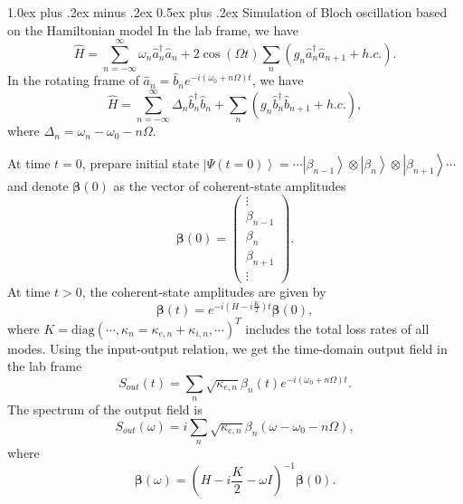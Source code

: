 \documentclass[
twocolumn,

superscriptaddress,









 amsmath,amssymb,
 aps,


prl,




]{revtex4-2}
\makeatletter
\providecommand{\subsubsection}{}
\renewcommand{\subsubsection}{
  \@startsection{subsubsection}{3}{0pt}
    {1.0ex plus .2ex minus .2ex}
    {0.5ex plus .2ex}
    {\normalfont\normalsize\bfseries\filcenter}
}
\newcommand{\ket}[1]{\left | #1 \right \rangle}
\newcommand{\opa}{\hat{a}}
\newcommand{\opad}{\hat{a}^\dagger}
\newcommand{\opb}{\hat{b}}
\newcommand{\opbd}{\hat{b}^\dagger}
\newcommand{\oph}{\hat{H}}
\makeatother
\begin{document}
\subsubsection{Simulation of Bloch oscillation based on the Hamiltonian model}
In the lab frame, we have
\begin{equation}
	\oph = \sum_{n=-\infty}^\infty \omega_n \opad_n \opa_n + 2 \cos (\Omega t) \sum_n (g_n \opad_n \opa_{n+1} + h.c.) .
\end{equation}
In the rotating frame of $\opa_n = \opb_n e^{-i(\omega_0+n\Omega) t}$, we have
\begin{equation}
	\oph = \sum_{n=-\infty}^\infty \Delta_n \opbd_n \opb_n + \sum_n (g_n \opbd_n \opb_{n+1} + h.c.) ,
\end{equation}
where $\Delta_n = \omega_n - \omega_0 - n\Omega$.

At time $t=0$, prepare initial state $\ket{\Psi(t=0)} = \cdots \ket{\beta_{n-1}} \otimes \ket{\beta_n} \otimes \ket{\beta_{n+1}} \cdots$ and denote $\bm{\beta}(0)$ as the vector of coherent-state amplitudes
\begin{equation}
	\bm{\beta}(0) = \begin{pmatrix} \vdots \\ \beta_{n-1} \\ \beta_n \\ \beta_{n+1} \\ \vdots \end{pmatrix} .
\end{equation}
At time $t > 0$, the coherent-state amplitudes are given by
\begin{equation}
	\bm{\beta} (t) = e^{-i(H-i\frac{K}{2})t} \bm{\beta} (0) ,
\end{equation}
where $K=\text{diag}(\cdots, \kappa_n = \kappa_{e,n}+\kappa_{i,n}, \cdots)^T$ includes the total loss rates of all modes. Using the input-output relation, we get the time-domain output field in the lab frame
\begin{equation}
	S_{out} (t) = \sum_n \sqrt{\kappa_{e,n}} \beta_n(t) e^{-i(\omega_0+n\Omega) t} .
\end{equation}
The spectrum of the output field is
\begin{equation}
	S_{out} (\omega) = i \sum_n \sqrt{\kappa_{e,n}} \beta_n(\omega - \omega_0 - n\Omega) ,
\end{equation}
where
\begin{equation}
	\bm{\beta} (\omega) = \left( H - i\frac{K}{2} - \omega I \right)^{-1} \bm{\beta} (0) .
\end{equation}
\end{document}
